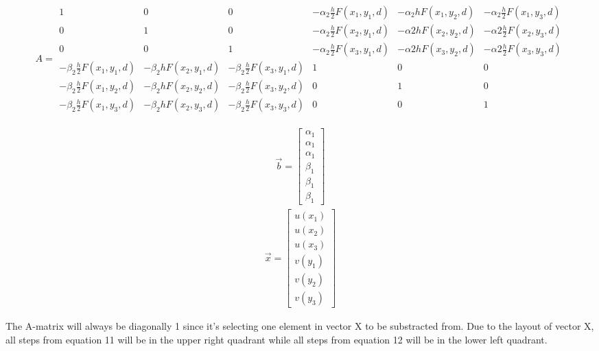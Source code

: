 \documentclass[10pt,a4paper]{article}
\begin{document}
\begin{align}
A = 
 \begin{smallmatrix}
  1 & 0 & 0 & -\alpha_{2}\frac{h}{2}F(x_{1},y_{1},d) & -\alpha_{2}hF(x_{1},y_{2},d)  & -\alpha_{2}\frac{h}{2}F(x_{1},y_{3},d) \\  
  0 & 1 & 0 & -\alpha_{2}\frac{h}{2}F(x_{2},y_{1},d) & -\alpha{2}hF(x_{2},y_{2},d)  & -\alpha{2}\frac{h}{2}F(x_{2},y_{3},d) \\
  0 & 0 & 1 & -\alpha_{2}\frac{h}{2}F(x_{3},y_{1},d) & -\alpha{2}hF(x_{3},y_{2},d)  & -\alpha{2}\frac{h}{2}F(x_{3},y_{3},d) \\
  -\beta_{2}\frac{h}{2}F(x_{1},y_{1},d)  & -\beta_{2}hF(x_{2},y_{1},d)  & -\beta_{2}\frac{h}{2}F(x_{3},y_{1},d)  & 1 & 0 & 0  \\
  -\beta_{2}\frac{h}{2}F(x_{1},y_{2},d)  & -\beta_{2}hF(x_{2},y_{2},d)  & -\beta_{2}\frac{h}{2}F(x_{3},y_{2},d)  & 0 & 1 & 0  \\
  -\beta_{2}\frac{h}{2}F(x_{1},y_{3},d)  & -\beta_{2}hF(x_{2},y_{3},d)  & -\beta_{2}\frac{h}{2}F(x_{3},y_{3},d)  & 0 & 0 & 1 
 \end{smallmatrix} 
\end{align} 

\begin{multicols}{2}
  \null \vfill
	\begin{align*}
		\overrightarrow{b} = \begin{bmatrix}
			\alpha_{1} \\
			\alpha_{1} \\
			\alpha_{1} \\
			\beta_{1} \\
			\beta_{1} \\
			\beta_{1}
		\end{bmatrix}
	\end{align*}
\break
  \vfill \null    
	\begin{align*}
		\overrightarrow{x} = \begin{bmatrix}
  			u(x_1) \\
  			u(x_2) \\
  			u(x_3) \\
  			v(y_1) \\
  			v(y_2) \\
  			v(y_3)
 	 	\end{bmatrix}
	\end{align*}
\end{multicols}


The A-matrix will always be diagonally 1 since it's selecting one element in vector X to be substracted from. Due to the layout of vector X, all steps from equation 11 will be in the upper right quadrant while all steps from equation 12 will be in the lower left quadrant.
\end{document}
